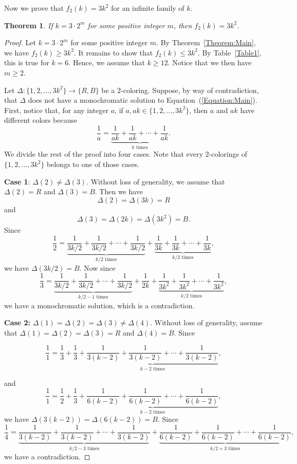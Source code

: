 \documentclass[11pt]{article}
\newtheorem{theorem}{Theorem}[section]
\theoremstyle{definition}
\begin{document}
Now we prove that $f_2(k)=3k^2$ for an infinite family of $k$.
\begin{theorem}
    If $k=3\cdot2^m$ for some positive integer $m$, then $f_2(k)=3k^2$.
\end{theorem}
\begin{proof}
    Let $k=3\cdot2^m$ for some positive integer $m$. By Theorem~\ref{Theorem:Main}, we have $f_2(k)\geq3k^2$. It remains to show that $f_2(k)\leq 3k^2$. By Table~\ref{Table1}, this is true for $k=6$. Hence, we assume that $k\geq12$. Notice that we then have $m\geq2$.


Let $\Delta:\{1,2,\ldots,3k^2\}\to\{R,B\}$ be a $2$-coloring. Suppose, by way of contradiction, that $\Delta$ does not have a monochromatic solution to Equation~(\ref{Equation:Main}). First, notice that, for any integer $a$, if $a,ak\in\{1,2,\ldots,3k^2\}$, then $a$ and $ak$ have different colors because
\[
\frac{1}{a}=\underbrace{\frac{1}{ak}+\frac{1}{ak}+\cdots+\frac{1}{ak}}_{k\text{ times}}.
\]
We divide the rest of the proof into four cases. Note that every 2-colorings of $\{1,2,\ldots,3k^2\}$ belongs to one of those cases.

\textbf{Case 1}: $\Delta(2)\neq\Delta(3)$. Without loss of generality, we assume that $\Delta(2)=R$ and $\Delta(3)=B$. Then we have
    \[
    \Delta(2)=\Delta(3k)=R
    \]
    and
    \[
    \Delta(3)=\Delta(2k)=\Delta(3k^2)=B.
    \]
Since
    \[
    \frac{1}{2}=\underbrace{\frac{1}{3k/2}+\frac{1}{3k/2}+\cdots+\frac{1}{3k/2}}_{k/2\text{ times}}+\underbrace{\frac{1}{3k}+\frac{1}{3k}+\cdots+\frac{1}{3k}}_{k/2\text{ times}},
    \]
    we have $\Delta(3k/2)=B$. Now since
\[\frac{1}{3}=\underbrace{\frac{1}{3k/2}+\frac{1}{3k/2}+\cdots+\frac{1}{3k/2}}_{k/2-1\text{ times}}+\frac{1}{2k}+\underbrace{\frac{1}{3k^2}+\frac{1}{3k^2}+\cdots+\frac{1}{3k^2}}_{k/2\text{ times}},\]
we have a monochromatic solution, which is a contradiction.

\textbf{Case 2:} $\Delta(1)=\Delta(2)=\Delta(3)\neq\Delta(4)$. Without loss of generality, assume that $\Delta(1)=\Delta(2)=\Delta(3)=R$ and $\Delta(4)=B$. Since

\[
\frac{1}{1}=\frac{1}{3}+\frac{1}{3}+\underbrace{\frac{1}{3(k-2)}+\frac{1}{3(k-2)}+\cdots+\frac{1}{3(k-2)}}_{k-2\text{ times}},
\]

and
\[
\frac{1}{1}=\frac{1}{2}+\frac{1}{3}+\underbrace{\frac{1}{6(k-2)}+\frac{1}{6(k-2)}+\cdots+\frac{1}{6(k-2)}}_{k-2\text{ times}},
\]
we have $\Delta(3(k-2))=\Delta(6(k-2))=B$. Since
\[
\frac{1}{4}=\underbrace{\frac{1}{3(k-2)}+\frac{1}{3(k-2)}+\cdots+\frac{1}{3(k-2)}}_{k/2-3\text{ times}}+\underbrace{\frac{1}{6(k-2)}+\frac{1}{6(k-2)}+\cdots+\frac{1}{6(k-2)}}_{k/2+3\text{ times}},
\]
we have a contradiction.


\end{proof}
\end{document}

